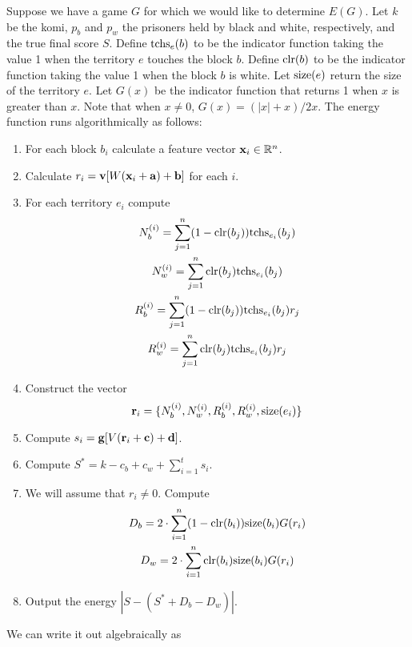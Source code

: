 \documentclass[11pt,letterpaper]{article}
\begin{document}
Suppose we have a game $G$ for which we would like to determine $E(G)$. Let $k$ be the komi, $p_b$ and $p_w$ the prisoners
held by black and white, respectively, and the true final score $S$. Define $\mbox{tchs}_{ e }{\left( b \right)}$ to be the indicator function
taking the value 1 when the territory $e$ touches the block $b$. Define $\mbox{clr}{\left( b \right)}$ to be the indicator function taking the
value 1 when the block $b$ is white. Let $\mbox{size}{\left( e \right)}$ return the size of the territory $e$. Let $G(x)$ be the
indicator function that returns 1 when $x$ is greater than $x$. Note that when $x \neq 0$,  $G(x) = (|x| + x) / 2x$. The energy
function runs algorithmically as follows:
\begin{enumerate}
  \item For each block $b_i$ calculate a feature vector $\mathbf{ x }_i \in \mathbb{ R }^n$.
  \item Calculate $r_i = \mathbf{ v }[W(\mathbf{ x }_i + \mathbf{ a }) + \mathbf{ b }]$ for each $i$.
  \item For each territory $e_i$ compute
    \begin{gather*}
      N_b^{ (i) } = \sum_{ j = 1 }^n (1 - \mbox{clr}{\left( b_j \right)}) \mbox{tchs}_{ e_i }{\left( b_j \right)}\\
      N_w^{ (i) } = \sum_{ j = 1 }^n \mbox{clr}{\left( b_j \right)} \mbox{tchs}_{ e_i }{\left( b_j \right)}\\
      R_b^{ (i) } = \sum_{ j = 1 }^n (1 - \mbox{clr}{\left( b_j \right)}) \mbox{tchs}_{ e_i }{\left( b_j \right)} r_j\\
      R_w^{ (i) } = \sum_{ j = 1 }^n \mbox{clr}{\left( b_j \right)} \mbox{tchs}_{ e_i }{\left( b_j \right)} r_j
    \end{gather*}
  \item Construct the vector
    $$\mathbf{ r }_i = \{ N_b^{ (i) }, N_w^{ (i) }, R_b^{ (i) }, R_w^{ (i) }, \mbox{size}{\left( e_i \right)} \}$$
  \item Compute $s_i = \mathbf{ g }[V(\mathbf{ r }_i + \mathbf{ c }) + \mathbf{ d }]$.
  \item Compute $S^* = k - c_b + c_w + \sum_{ i = 1 }^t s_i$.
  \item We will assume that $r_i \neq 0$. Compute
    \begin{gather*}
      D_b = 2 \cdot \sum_{ i = 1 }^n (1 - \mbox{clr}{\left( b_i \right)}) \mbox{size}{\left( b_i \right)} G(r_i)\\
      D_w = 2 \cdot \sum_{ i = 1 }^n \mbox{clr}{\left( b_i \right)} \mbox{size}{\left( b_i \right)} G(r_i)
    \end{gather*}
  \item Output the energy $|S - (S^* + D_b - D_w)|$.
\end{enumerate}
We can write it out algebraically as
\end{document}
